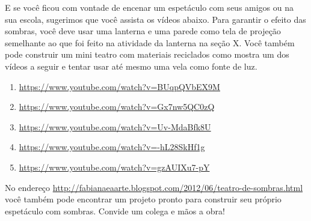 E se você ficou com vontade de encenar um espetáculo com seus amigos ou na sua escola, sugerimos que você assista os vídeos abaixo. Para garantir o efeito das sombras, você deve usar uma lanterna e uma parede como tela de projeção semelhante ao que foi feito na atividade da lanterna na seção X. Você também pode construir um mini teatro com materiais reciclados como mostra um dos vídeos a seguir e tentar usar até mesmo uma vela como fonte de luz.
\begin{enumerate}
\item {} 
\url{https://www.youtube.com/watch?v=BUqpQVbEX9M}

\item {} 
\url{https://www.youtube.com/watch?v=Gx7nw5QC0zQ}

\item {} 
\url{https://www.youtube.com/watch?v=Uv-MdaBfk8U}

\item {} 
\url{https://www.youtube.com/watch?v=-hL28SkHf1g}

\item {} 
\url{https://www.youtube.com/watch?v=gzAUIXu7-pY}

\end{enumerate}



No endereço \url{http://fabianaeaarte.blogspot.com/2012/06/teatro-de-sombras.html} você também pode encontrar um projeto pronto para construir seu próprio espetáculo com sombras. Convide um colega e mãos a obra!


\exercise
\label{\detokenize{GE301-E:exercicios}}\label{\detokenize{GE301-E::doc}}

